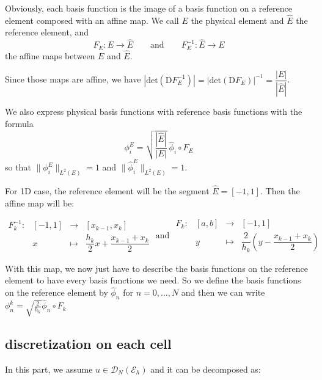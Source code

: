\documentclass[a4paper,10pt]{article}
\begin{document}
Obviously, each basis function is the image of a basis function on a reference element composed 
with an affine map. We call $E$ the physical element and $\hat E$ the reference element, and
\begin{equation*}
 F_E : E \longrightarrow \hat E \qquad \text{and} \qquad  F_E^{-1} : \hat E \longrightarrow  E
\end{equation*}
the affine maps between $E$ and $\hat E$.

Since those maps are affine, we have $|\mathrm{det}(\mathrm{D}F_E^{-1})| = 
|\mathrm{det}(\mathrm{D}F_E)|^{-1} = \dfrac{|E|}{|\hat E|}$.

We also express physical basis functions with reference basis functions with the formula 
\begin{equation*}
 \phi_i^E = \sqrt{\dfrac{|\hat E|}{|E|}}\ \hat \phi_i \circ F_E
\end{equation*}
so that $\|\phi_i^E\|_{L^2(E)}=1$ and $\|\hat \phi_i^E\|_{L^2(E)}=1$.

For 1D case, the reference element will be the segment $\hat E = [-1,1]$. Then 
the affine map will be:

\begin{equation*}
\begin{array}{cccc}
 F_k^{-1} : & [-1,1] & \longrightarrow & [x_{k-1},x_k] \\
            & x & \longmapsto & \dfrac{h_k}{2} x + \dfrac{x_{k-1}+x_k}{2}
\end{array}
\text{ and }
\begin{array}{cccc}
 F_k : & [a,b] & \longrightarrow & [-1,1] \\
            & y & \longmapsto & \dfrac{2}{h_k} \left(y - \dfrac{x_{k-1}+x_k}{2}\right)
\end{array}
\end{equation*}

 With this map, we now just have to describe the basis functions on the reference element to have 
every basis functions we need. So we define the basis functions on the reference element by $\hat 
\phi_n$ for $n= 0, \dots , N$ and then we can write $\phi_n^k = \sqrt{\frac{2}{h_k}} \hat 
\phi_n \circ F_k$

\subsection{discretization on each cell}

In this part, we assume $u \in \mathcal{D}_N(\mathcal{E}_h)$ and it can be decomposed as:
\end{document}
